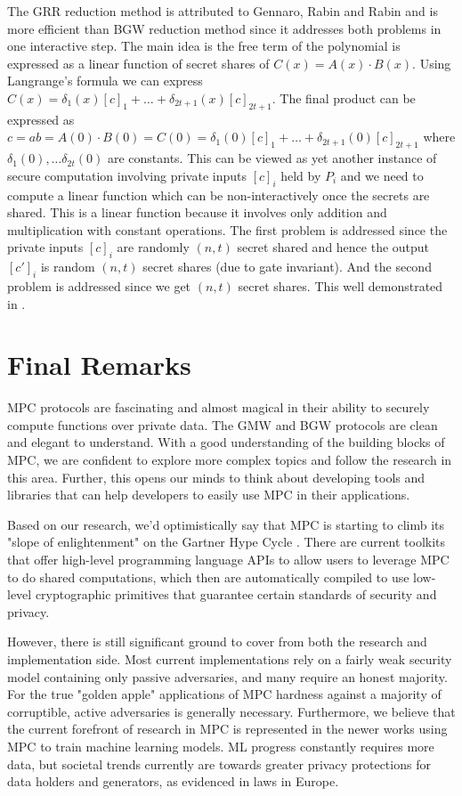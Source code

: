 \documentclass[11pt]{article}
\begin{document}
The GRR reduction method is attributed to Gennaro, Rabin and Rabin \cite{20} and is more efficient than BGW reduction method since it addresses both problems in one interactive step. The main idea is the free term of the polynomial is expressed as a linear function of secret shares of $C(x) = A(x) \cdot B(x)$. Using Langrange's formula we can express $C(x) = \delta_1(x)[c]_1 + \dots + \delta_{2t+1}(x)[c]_{2t+1}$. The final product can be expressed as $c = ab = A(0) \cdot B(0) = C(0) = \delta_1(0)[c]_1 + \dots + \delta_{2t+1}(0)[c]_{2t+1}$ where $\delta_1(0), \dots \delta_{2t}(0)$ are constants. This can be viewed as yet another instance of secure computation involving private inputs $[c]_i$ held by $P_i$ and we need to compute a linear function which can be non-interactively once the secrets are shared. This is a linear function because it involves only addition and multiplication with constant operations. The first problem is addressed since the private inputs $[c]_i$ are randomly $(n, t)$ secret shared and hence the output $[c']_i$ is random $(n, t)$ secret shares (due to gate invariant). And the second problem is addressed since we get $(n, t)$ secret shares. This well demonstrated in \cite{20}.

\section*{Final Remarks}

MPC protocols are fascinating and almost magical in their ability to securely compute functions over private data. The GMW and BGW protocols are clean and elegant to understand. With a good understanding of the building blocks of MPC, we are confident to explore more complex topics and follow the research in this area. Further, this opens our minds to think about developing tools and libraries that can help developers to easily use MPC in their applications.

Based on our research, we'd optimistically say that MPC is starting to climb its "slope of enlightenment" on the Gartner Hype Cycle \cite{6}. 
There are current toolkits that offer high-level programming language APIs to allow users to leverage MPC to do shared computations, which then 
are automatically compiled to use low-level cryptographic primitives that guarantee certain standards of security and privacy. 

However, there is still significant ground to cover from both the research and implementation side. Most current implementations rely on a fairly weak 
security model containing only passive adversaries, and many require an honest majority. For the true "golden apple" applications of MPC hardness against a majority of 
corruptible, active adversaries is generally necessary. Furthermore, we believe that the current forefront of research in MPC 
is represented in the newer works using MPC to train machine learning models. ML progress constantly requires more data, but 
societal trends currently are towards greater privacy protections for data holders and generators, as evidenced in laws in Europe.
\end{document}
